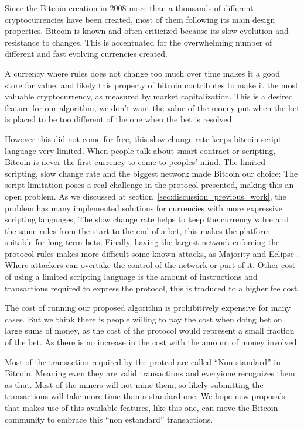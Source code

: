 Since the Bitcoin creation in 2008 more than a thousands of different
  cryptocurrencies have been created, most of them following its main design
  properties.
Bitcoin is known and often criticized because its slow evolution and resistance
  to changes.
This is accentuated for the overwhelming number of different and fast evolving
  currencies created.

A currency where rules does not change too much over time makes it a good store
  for value, and likely this property of bitcoin contributes to make it the
  most valuable cryptocurrency, as measured by market capitalization.
This is a desired feature for our algorithm, we don't want the value of the
  money put when the bet is placed to be too different of the one when the bet
  is resolved.

However this did not come for free, this slow change rate keeps bitcoin script
  language very limited.
When people talk about smart contract or scripting, Bitcoin is never the first
  currency to come to peoples' mind.
The limited scripting, slow change rate and the biggest network made Bitcoin our
  choice:
The script limitation poses a real challenge in the protocol presented, making this
  an open problem.
As we discussed at section~\ref{sec:discussion_previous_work}, the problem has
  many implemented solutions for currencies with more expressive scripting
  languages;
The slow change rate helps to keep the currency value and the same rules from
  the start to the end of a bet, this makes the platform suitable for long term
  bets;
Finally, having the largest network enforcing the protocol rules makes more
  difficult some known attacks, as Majority and Eclipse
  \cite{heilman2015eclipse}.
Where attackers can overtake the control of the network or part of it.
Other cost of using a limited scripting language is the amount of instructions
  and transactions required to express the protocol, this is traduced to a
  higher fee cost.

The cost of running our proposed algorithm is prohibitively expensive for many
  cases.
But we think there is people willing to pay the cost when doing bet on large
  sums of money, as the cost of the protocol would represent a small fraction of
  the bet.
As there is no increase in the cost with the amount of money involved.

Most of the transaction required by the protcol are called ``Non standard''
  in Bitcoin.
Meaning even they are valid transactions and everyione recognizes them as that.
Most of the miners will not mine them, so likely submitting the transactions
  will take more time than a standard one.
We hope new proposals that makes use of this available features, like this one,
  can move the Bitcoin community to embrace this ``non estandard'' transactions.

